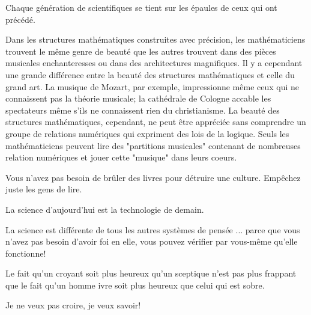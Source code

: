 \documentclass[12pt,a4paper,twoside,openright]{report}
\theoremstyle{definition}
\theoremstyle{itexmp}
\numberwithin{equation}{section}
\begin{document}
 	\begin{fquote}Chaque génération de scientifiques se tient sur les épaules de ceux qui ont précédé.
 	\end{fquote}
 	
 	\begin{fquote}Dans les structures mathématiques construites avec précision, les mathématiciens trouvent le même genre de beauté que les autres trouvent dans des pièces musicales enchanteresses ou dans des architectures magnifiques. Il y a cependant une grande différence entre la beauté des structures mathématiques et celle du grand art. La musique de Mozart, par exemple, impressionne même ceux qui ne connaissent pas la théorie musicale; la cathédrale de Cologne accable les spectateurs même s'ils ne connaissent rien du christianisme. La beauté des structures mathématiques, cependant, ne peut être appréciée sans comprendre un groupe de relations numériques qui expriment des lois de la logique. Seuls les mathématiciens peuvent lire des "partitions musicales" contenant de nombreuses relation numériques et jouer cette "musique" dans leurs coeurs.
 	\end{fquote}
 	
 	\begin{fquote}Vous n'avez pas besoin de brûler des livres pour détruire une culture. Empêchez juste les gens de lire.
 	\end{fquote}
 	
 	 \begin{fquote}La science d'aujourd'hui est la technologie de demain.
 	\end{fquote}
 	
 	 \begin{fquote}La science est différente de tous les autres systèmes de pensée ... parce que vous n'avez pas besoin d'avoir foi en elle, vous pouvez vérifier par vous-même qu'elle fonctionne!
 	\end{fquote}
 	
 	\begin{fquote}Le fait qu'un croyant soit plus heureux qu'un sceptique n'est pas plus frappant que le fait qu'un homme ivre soit plus heureux que celui qui est sobre.
 	\end{fquote}
 	
 	\begin{fquote}Je ne veux pas croire, je veux savoir!
 	\end{fquote}
 	
\end{document}
